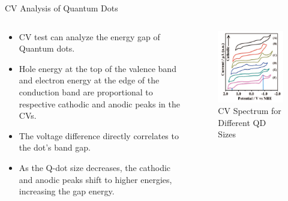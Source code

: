 \documentclass{beamer}
\begin{document}
\begin{frame}{CV Analysis of Quantum Dots}
    \begin{columns}
        \begin{column}{0.6\textwidth}
            \begin{itemize}
                \item CV test can analyze the energy gap of Quantum dots.
                \item Hole energy at the top of the valence band and electron energy at the edge of the conduction band are proportional to respective cathodic and anodic peaks in the CVs.
                \item The voltage difference directly correlates to the dot's band gap.
                \item As the Q-dot size decreases, the cathodic and anodic peaks shift to higher energies, increasing the gap energy.
                
            \end{itemize}
        \end{column}
        \begin{column}{0.4\textwidth}
            \begin{figure}
                \centering
                \includegraphics[scale=0.3]{CV_QDs.png}
                \caption{CV Spectrum for Different QD Sizes}
                \label{fig:CV}
            \end{figure}
        \end{column}
    \end{columns}
\end{frame}
\end{document}

